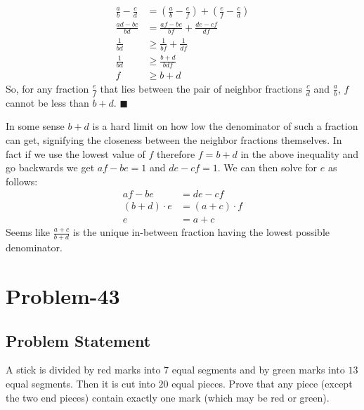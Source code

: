 \documentclass{article}
\begin{document}
\begin{displaymath}
\begin{split}
	\frac{a}{b}-\frac{c}{d} &= \left( \frac{a}{b}-\frac{e}{f} \right) + \left( \frac{e}{f}-\frac{c}{d} \right)\\
	\frac{ad-bc}{bd}&= \frac{af-be}{bf}+\frac{de-cf}{df}\\
	\frac{1}{bd} &\geq \frac{1}{bf}+\frac{1}{df}\\
	\frac{1}{bd} &\geq \frac{b+d}{bdf}\\
	f &\geq b+d
\end{split}
\end{displaymath}
So, for any fraction $\frac{e}{f}$ that lies between the pair of neighbor fractions $\frac{c}{d}$ and $\frac{a}{b}$, $f$ cannot be less than $b+d$.  $\blacksquare$

In some sense $b+d$ is a hard limit on how low the denominator of such a fraction can get, signifying the closeness between the neighbor fractions themselves. In fact if we use the lowest value of $f$ therefore $f=b+d$ in the above inequality and go backwards we get $af-be = 1$ and $de-cf = 1$. We can then solve for $e$ as follows:
\begin{displaymath}
\begin{split}
	af-be &= de-cf\\
   (b+d)\cdot e &= (a+c)\cdot f\\
       e  &= a+c
\end{split}
\end{displaymath}
Seems like $\frac{a+c}{b+d}$ is the unique in-between fraction having the lowest possible denominator.

\section*{Problem-43}

\subsection*{Problem Statement}
A stick is divided by red marks into $7$ equal segments and by green marks into $13$ equal segments. Then it is cut into $20$ equal pieces. Prove that any piece (except the two end pieces) contain exactly one mark (which may be red or green).
\end{document}
